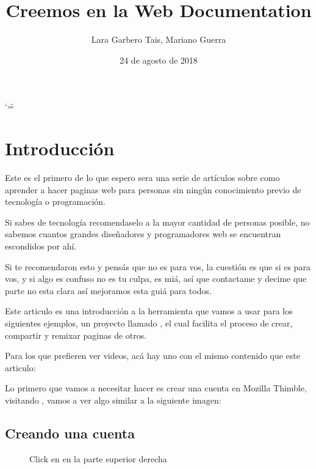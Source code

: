 \documentclass[letterpaper,10pt,spanish]{sphinxmanual}
\title{Creemos en la Web Documentation}
\date{24 de agosto de 2018}
\author{Lara Garbero Tais, Mariano Guerra}
\begin{document}
\ifnum\catcode`\"=\active{}\fi
\maketitle
\sphinxtableofcontents
{}\label{\detokenize{index::doc}}



\chapter{Introducción}
\label{\detokenize{introduccion:introduccion}}\label{\detokenize{introduccion::doc}}\label{\detokenize{introduccion:creemos-en-la-web}}
Este es el primero de lo que espero sera una serie de artículos sobre como aprender a hacer paginas web para personas sin ningún conocimiento previo de tecnología o programación.

Si sabes de tecnología recomendaselo a la mayor cantidad de personas posible, no sabemos cuantos grandes diseñadores y programadores web se encuentran escondidos por ahí.

Si te recomendaron esto y pensás que no es para vos, la cuestión es que si es para vos, y si algo es confuso no es tu culpa, es miá, así que contactame y decime que parte no esta clara así mejoramos esta guiá para todos.

Este articulo es una introducción a la herramienta que vamos a usar para los siguientes ejemplos, un proyecto llamado , el cual facilita el proceso de crear, compartir y remixar paginas de otros.

Para los que prefieren ver videos, acá hay uno con el mismo contenido que este articulo:



Lo primero que vamos a necesitar hacer es crear una cuenta en Mozilla Thimble, visitando , vamos a ver algo similar a la siguiente imagen:

\begin{figure}[htbp]
\centering

\noindent{}
\end{figure}


\section{Creando una cuenta}
\label{\detokenize{introduccion:creando-una-cuenta}}
\begin{figure}[htbp]
\centering
\capstart

\noindent{}
\caption{Click en  en la parte superior derecha}\label{\detokenize{introduccion:id1}}\end{figure}
\end{document}

